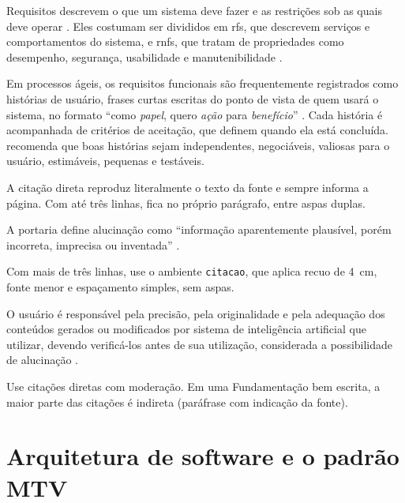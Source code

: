 Requisitos descrevem o que um sistema deve fazer e as restrições sob as quais
deve operar \cite{sommerville2018engenharia}. Eles costumam ser divididos em
\acp{rf}, que descrevem serviços e comportamentos do sistema, e \acp{rnf}, que
tratam de propriedades como desempenho, segurança, usabilidade e
manutenibilidade \cite{sommerville2018engenharia}.

Em processos ágeis, os requisitos funcionais são frequentemente registrados
como histórias de usuário, frases curtas escritas do ponto de vista de quem
usará o sistema, no formato ``como \emph{papel}, quero \emph{ação} para
\emph{benefício}'' \cite{cohn2004user}. Cada história é acompanhada de
critérios de aceitação, que definem quando ela está concluída.
\textcite{cohn2004user} recomenda que boas histórias sejam independentes,
negociáveis, valiosas para o usuário, estimáveis, pequenas e testáveis.

\begin{instrucao}
A citação direta reproduz literalmente o texto da fonte e sempre informa a
página. Com até três linhas, fica no próprio parágrafo, entre aspas duplas.
\begin{exemplo}
A portaria define alucinação como
``informação aparentemente plausível,
porém incorreta, imprecisa ou
inventada'' \cite[p.~1]{ufes2026portaria}.
\end{exemplo}
Com mais de três linhas, use o ambiente \verb|citacao|, que aplica recuo de
4~cm, fonte menor e espaçamento simples, sem aspas.
\begin{exemplo}
\begin{citacao}
O usuário é responsável pela precisão,
pela originalidade e pela adequação dos
conteúdos gerados ou modificados por
sistema de inteligência artificial que
utilizar, devendo verificá-los antes de
sua utilização, considerada a
possibilidade de alucinação
\cite[p.~5]{ufes2026portaria}.
\end{citacao}
\end{exemplo}
Use citações diretas com moderação. Em uma Fundamentação bem escrita, a maior
parte das citações é indireta (paráfrase com indicação da fonte).
\end{instrucao}

\section{Arquitetura de software e o padrão MTV}
\label{sec:fundamentacao:arquitetura}

